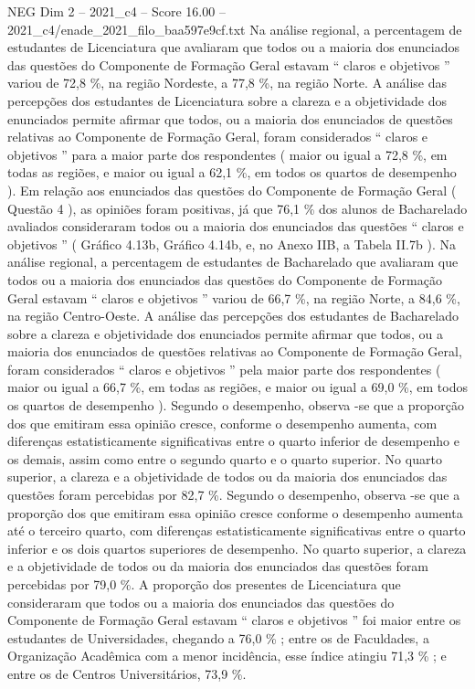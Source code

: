 \begin{textsample}{NEG Dim 2 – 2021\_c4 – Score 16.00 – 2021\_c4/enade\_2021\_filo\_baa597e9cf.txt}
Na análise regional, a percentagem de estudantes de Licenciatura que avaliaram que todos ou a maioria dos enunciados das questões do Componente de Formação Geral estavam “ claros e objetivos ” variou de 72,8 \%, na região Nordeste, a 77,8 \%, na região Norte.
A análise das percepções dos estudantes de Licenciatura sobre a clareza e a objetividade dos enunciados permite afirmar que todos, ou a maioria dos enunciados de questões relativas ao Componente de Formação Geral, foram considerados “ claros e objetivos ” para a maior parte dos respondentes ( maior ou igual a 72,8 \%, em todas as regiões, e maior ou igual a 62,1 \%, em todos os quartos de desempenho ).
Em relação aos enunciados das questões do Componente de Formação Geral ( Questão 4 ), as opiniões foram positivas, já que 76,1 \% dos alunos de Bacharelado avaliados consideraram todos ou a maioria dos enunciados das questões “ claros e objetivos ” ( Gráfico 4.13b, Gráfico 4.14b, e, no Anexo IIB, a Tabela II.7b ).
Na análise regional, a percentagem de estudantes de Bacharelado que avaliaram que todos ou a maioria dos enunciados das questões do Componente de Formação Geral estavam “ claros e objetivos ” variou de 66,7 \%, na região Norte, a 84,6 \%, na região Centro-Oeste.
A análise das percepções dos estudantes de Bacharelado sobre a clareza e objetividade dos enunciados permite afirmar que todos, ou a maioria dos enunciados de questões relativas ao Componente de Formação Geral, foram considerados “ claros e objetivos ” pela maior parte dos respondentes ( maior ou igual a 66,7 \%, em todas as regiões, e maior ou igual a 69,0 \%, em todos os quartos de desempenho ).
Segundo o desempenho, observa -se que a proporção dos que emitiram essa opinião cresce, conforme o desempenho aumenta, com diferenças estatisticamente significativas entre o quarto inferior de desempenho e os demais, assim como entre o segundo quarto e o quarto superior.
No quarto superior, a clareza e a objetividade de todos ou da maioria dos enunciados das questões foram percebidas por 82,7 \%.
Segundo o desempenho, observa -se que a proporção dos que emitiram essa opinião cresce conforme o desempenho aumenta até o terceiro quarto, com diferenças estatisticamente significativas entre o quarto inferior e os dois quartos superiores de desempenho.
No quarto superior, a clareza e a objetividade de todos ou da maioria dos enunciados das questões foram percebidas por 79,0 \%.
A proporção dos presentes de Licenciatura que consideraram que todos ou a maioria dos enunciados das questões do Componente de Formação Geral estavam “ claros e objetivos ” foi maior entre os estudantes de Universidades, chegando a 76,0 \% ; entre os de Faculdades, a Organização Acadêmica com a menor incidência, esse índice atingiu 71,3 \% ; e entre os de Centros Universitários, 73,9 \%.

\end{textsample}
